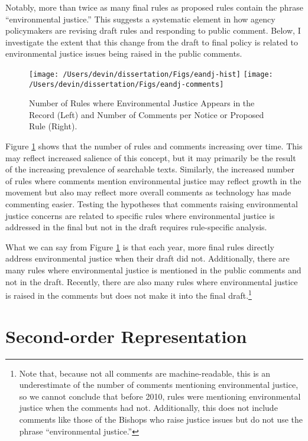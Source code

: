 \documentclass[
      12pt,
        ]{article}
\begin{document}
Notably, more than twice as many final rules as proposed rules contain
the phrase ``environmental justice.'' This suggests a systematic element
in how agency policymakers are revising draft rules and responding to
public comment. Below, I investigate the extent that this change from
the draft to final policy is related to environmental justice issues
being raised in the public comments.

\begin{figure}

{\centering \texttt{[image: /Users/devin/dissertation/Figs/eandj-hist]} \texttt{[image: /Users/devin/dissertation/Figs/eandj-comments]} 

}

\caption{Number of Rules where Environmental Justice Appears in the Record (Left) and Number of Comments per Notice or Proposed Rule (Right).}\label{fig:ej}
\end{figure}

Figure \ref{fig:ej}
shows that the number of rules and comments increasing over time. This
may reflect increased salience of this concept, but it may primarily be
the result of the increasing prevalence of searchable texts. Similarly,
the increased number of rules where comments mention environmental
justice may reflect growth in the movement but also may reflect more
overall comments as technology has made commenting easier. Testing the
hypotheses that comments raising environmental justice concerns are
related to specific rules where environmental justice is addressed in
the final but not in the draft requires rule-specific analysis.

What we can say from Figure \ref{fig:ej} is that each year, more final rules directly address
environmental justice when their draft did not. Additionally, there are
many rules where environmental justice is mentioned in the public
comments and not in the draft. Recently, there are also many rules where
environmental justice is raised in the comments but does not make it
into the final draft.\footnote{Note that, because not all comments are machine-readable, this is an
  underestimate of the number of comments mentioning environmental
  justice, so we cannot conclude that before 2010, rules were
  mentioning environmental justice when the comments had not.
  Additionally, this does not include comments like those of the
  Bishops who raise justice issues but do not use the phrase
  ``environmental justice.''}

\hypertarget{second-order-representation}{%
\section{Second-order Representation}\label{second-order-representation}}
\end{document}
